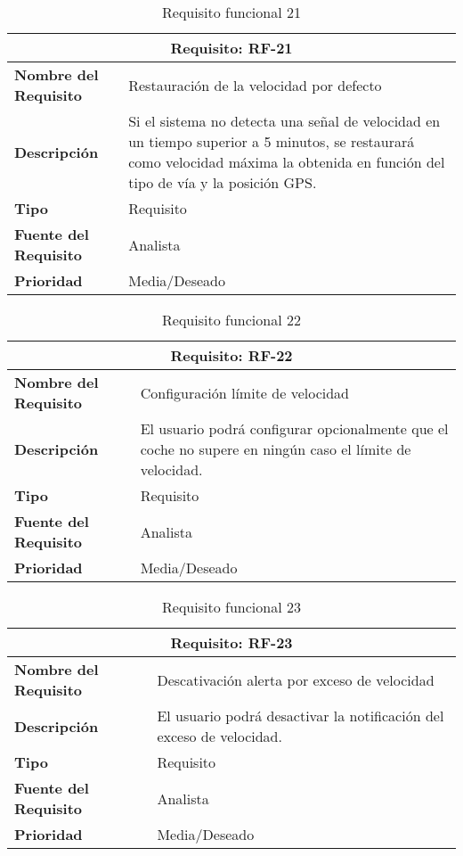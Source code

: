 \begin{table}[H]
\begin{center}
\begin{tabular}{p{} p{7cm}}
\multicolumn{2}{c}{\textbf{Requisito: RF-21} } \\
\hline \hline
\textbf{Nombre del Requisito} & Restauración de la velocidad por defecto \\
\hline
\textbf{Descripción} & Si el sistema no detecta una señal de velocidad en un tiempo superior a 5 minutos, se restaurará como velocidad máxima la obtenida en función del tipo de vía y la posición GPS.  \\
\hline
\textbf{Tipo} & Requisito  \\
\hline
\textbf{Fuente del Requisito} & Analista  \\
\hline
\textbf{Prioridad} & Media/Deseado  \\ \hline
\end{tabular}
\caption{Requisito funcional 21}
\label{tab:RF-21}
\end{center}
\end{table}

\begin{table}[H]
\begin{center}
\begin{tabular}{p{} p{7cm}}
\multicolumn{2}{c}{\textbf{Requisito: RF-22} } \\
\hline \hline
\textbf{Nombre del Requisito} & Configuración límite de velocidad \\
\hline
\textbf{Descripción} & El usuario podrá configurar opcionalmente que el coche no supere en ningún caso el límite de velocidad. \\
\hline
\textbf{Tipo} & Requisito  \\
\hline
\textbf{Fuente del Requisito} & Analista  \\
\hline
\textbf{Prioridad} & Media/Deseado  \\ \hline
\end{tabular}
\caption{Requisito funcional 22}
\label{tab:RF-22}
\end{center}
\end{table}

\begin{table}[H]
\begin{center}
\begin{tabular}{p{} p{7cm}}
\multicolumn{2}{c}{\textbf{Requisito: RF-23} } \\
\hline \hline
\textbf{Nombre del Requisito} & Descativación alerta por exceso de velocidad \\
\hline
\textbf{Descripción} & El usuario podrá desactivar la notificación del exceso de velocidad. \\
\hline
\textbf{Tipo} & Requisito  \\
\hline
\textbf{Fuente del Requisito} & Analista  \\
\hline
\textbf{Prioridad} & Media/Deseado  \\ \hline
\end{tabular}
\caption{Requisito funcional 23}
\label{tab:RF-23}
\end{center}
\end{table}

